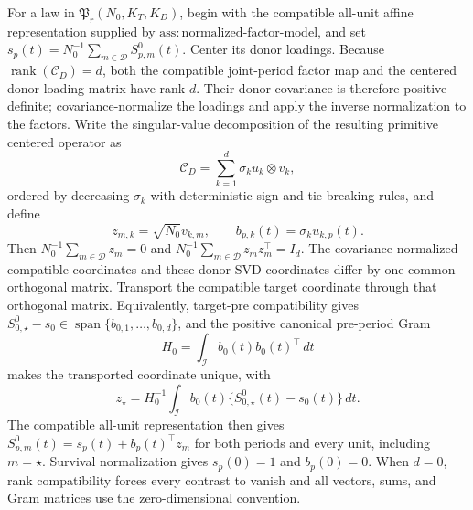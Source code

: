 For a law in \(\mathfrak P_r(N_0,K_T,K_D)\), begin with the compatible all-unit affine representation supplied by \(\mathrm{ass:normalized\mbox{-}factor\mbox{-}model}\), and set \(s_p(t)=N_0^{-1}\sum_{m\in\mathcal D}S^0_{p,m}(t)\). Center its donor loadings. Because \(\operatorname{rank}(\mathcal C_D)=d\), both the compatible joint-period factor map and the centered donor loading matrix have rank \(d\). Their donor covariance is therefore positive definite; covariance-normalize the loadings and apply the inverse normalization to the factors. Write the singular-value decomposition of the resulting primitive centered operator as
\[
 \mathcal C_D=\sum_{k=1}^d\sigma_k u_k\otimes v_k,
\]
ordered by decreasing \(\sigma_k\) with deterministic sign and tie-breaking rules, and define
\[
 z_{m,k}=\sqrt{N_0}v_{k,m},
 \qquad b_{p,k}(t)=\sigma_k u_{k,p}(t).
\]
Then \(N_0^{-1}\sum_{m\in\mathcal D}z_m=0\) and \(N_0^{-1}\sum_{m\in\mathcal D}z_mz_m^\top=I_d\). The covariance-normalized compatible coordinates and these donor-SVD coordinates differ by one common orthogonal matrix. Transport the compatible target coordinate through that orthogonal matrix. Equivalently, target-pre compatibility gives \(S^0_{0,\star}-s_0\in\operatorname{span}\{b_{0,1},\ldots,b_{0,d}\}\), and the positive canonical pre-period Gram
\[
 H_0=\int_{\mathcal I}b_0(t)b_0(t)^\top\,dt
\]
makes the transported coordinate unique, with
\[
 z_\star=H_0^{-1}\int_{\mathcal I}b_0(t)\{S^0_{0,\star}(t)-s_0(t)\}\,dt.
\]
The compatible all-unit representation then gives \(S^0_{p,m}(t)=s_p(t)+b_p(t)^\top z_m\) for both periods and every unit, including \(m=\star\). Survival normalization gives \(s_p(0)=1\) and \(b_p(0)=0\). When \(d=0\), rank compatibility forces every contrast to vanish and all vectors, sums, and Gram matrices use the zero-dimensional convention.